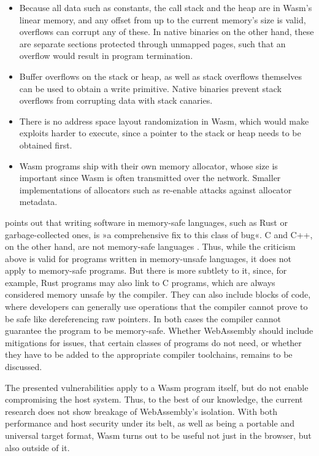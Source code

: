 \begin{itemize}
    \item Because all data such as constants, the call stack and the heap are in Wasm's linear memory, and any offset from up to the current memory's size is valid, overflows can corrupt any of these. In native binaries on the other hand, these are separate sections protected through unmapped pages, such that an overflow would result in program termination.
    \item Buffer overflows on the stack or heap, as well as stack overflows themselves can be used to obtain a write primitive. Native binaries prevent stack overflows from corrupting data with stack canaries.
    \item There is no address space layout randomization in Wasm, which would make exploits harder to execute, since a pointer to the stack or heap needs to be obtained first.
    \item Wasm programs ship with their own memory allocator, whose size is important since Wasm is often transmitted over the network. Smaller implementations of allocators such as  re-enable attacks against allocator metadata.
\end{itemize}

\citeauthor{Wingo2020} points out that writing software in memory-safe languages, such as Rust or garbage-collected ones, is »a comprehensive fix to this class of bug«. C and C++, on the other hand, are not memory-safe languages \cite{Wingo2020}. Thus, while the criticism above is valid for programs written in memory-unsafe languages, it does not apply to memory-safe programs. But there is more subtlety to it, since, for example, Rust programs may also link to C programs, which are always considered memory unsafe by the compiler. They can also include blocks of  code, where developers can generally use operations that the compiler cannot prove to be safe like dereferencing raw pointers. In both cases the compiler cannot guarantee the program to be memory-safe. Whether WebAssembly should include mitigations for issues, that certain classes of programs do not need, or whether they have to be added to the appropriate compiler toolchains, remains to be discussed.

The presented vulnerabilities apply to a Wasm program itself, but do not enable compromising the host system. Thus, to the best of our knowledge, the current research does not show breakage of WebAssembly's isolation. With both performance and host security under its belt, as well as being a portable and universal target format, Wasm turns out to be useful not just in the browser, but also outside of it.

